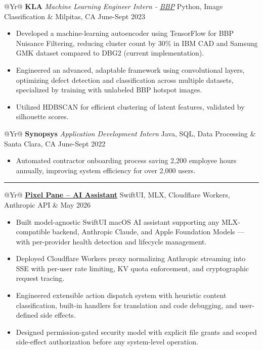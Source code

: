 \documentclass[11pt,letterpaper]{article}
\makeatletter
\newcommand{\sectionstyle}{\fontfamily{phv}\bfseries\selectfont}
\newcommand{\link}[2]{\href{#1}{\textcolor{linkblue}{\underline{#2}}}}
\newcommand{\resumesection}[1]{%
  \vspace{2pt}%
  {\centering{\sectionstyle\large #1}\par}%
  \nointerlineskip\vspace{2pt}\hrule\vspace{3pt}%
}
\newcommand{\experienceentry}[5]{%
  \begin{tabularx}{\linewidth}{@{}Yr@{}}
    {\sectionstyle #1} \textbar{} \textit{#2} \textbar{} #3 & #4 \textbar{} #5
  \end{tabularx}%
}
\newcommand{\projectentry}[4]{%
  \begin{tabularx}{\linewidth}{@{}Yr@{}}
    \link{#1}{\sectionstyle #2} \textbar{} #3 & #4
  \end{tabularx}%
}
\newenvironment{resumebullets}{%
  \RaggedRight
  \begin{itemize}[
    label=\raisebox{0.25ex}{\rule{3pt}{3pt}},
    leftmargin=0.32in,
    labelsep=0.12in,
    itemsep=0pt,
    topsep=0pt,
    parsep=0pt,
    partopsep=0pt
  ]%
}{\end{itemize}}
\makeatother
\begin{document}
\experienceentry{KLA}{Machine Learning Engineer Intern - \link{https://snehithn.com/images/KLA-BBP.pdf}{BBP}}{Python, Image Classification}{Milpitas, CA}{June-Sept 2023}
\begin{resumebullets}
  \item Developed a machine-learning autoencoder using TensorFlow for BBP Nuisance Filtering, reducing
  cluster count by 30\% in IBM CAD and Samsung GMK dataset compared to DBG2 (current implementation).
  \item Engineered an advanced, adaptable framework using convolutional layers, optimizing defect detection
  and classification across multiple datasets, specialized by training with unlabeled BBP hotspot images.
  \item Utilized HDBSCAN for efficient clustering of latent features, validated by silhouette scores.
\end{resumebullets}

\experienceentry{Synopsys}{Application Development Intern}{Java, SQL, Data Processing}{Santa Clara, CA}{June-Sept 2022}
\begin{resumebullets}
  \item Automated contractor onboarding process saving 2,200 employee hours annually, improving system
  efficiency for over 2,000 users.
\end{resumebullets}

\resumesection{PROJECTS}

\projectentry{https://pixelpane.app}{Pixel Pane -- AI Assistant}{SwiftUI, MLX, Cloudflare Workers, Anthropic API}{May 2026}
\begin{resumebullets}
  \item Built model-agnostic SwiftUI macOS AI assistant supporting any MLX-compatible backend, Anthropic Claude, and Apple Foundation Models — with per-provider health detection and lifecycle management.
  \item Deployed Cloudflare Workers proxy normalizing Anthropic streaming into SSE with per-user rate limiting, KV quota enforcement, and cryptographic request tracing.
  \item Engineered extensible action dispatch system with heuristic content classification, built-in handlers for translation and code debugging, and user-defined side effects.
  \item Designed permission-gated security model with explicit file grants and scoped side-effect authorization before any system-level operation.
\end{resumebullets}
\end{document}
